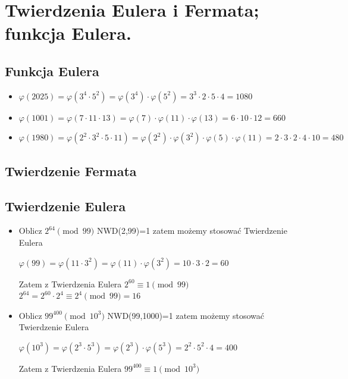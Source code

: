 \documentclass[12pt]{article}
\begin{document}
    \section{Twierdzenia Eulera i Fermata; funkcja Eulera.}
    \subsection{Funkcja Eulera}

    \begin{itemize}
        \item $\varphi(2025) = \varphi(3^4 \cdot 5^2) = \varphi(3^4) \cdot \varphi(5^2) = 3^3 \cdot 2 \cdot 5 \cdot 4 = 1080$
        \item $\varphi(1001) = \varphi(7\cdot11\cdot13) = \varphi(7) \cdot \varphi(11) \cdot \varphi(13) = 6 \cdot 10 \cdot12 = 660$
        \item $\varphi(1980) = \varphi(2^2 \cdot 3^2 \cdot 5 \cdot 11) = \varphi(2^2) \cdot \varphi(3^2) \cdot \varphi (5) \cdot \varphi(11) = 2 \cdot 3 \cdot 2 \cdot 4 \cdot 10 = 480$
    \end{itemize}

    \subsection{Twierdzenie Fermata}

    \subsection{Twierdzenie Eulera}
    \begin{itemize}
        \item Oblicz $2^{64} \pmod {99}$\newline
        NWD(2,99)=1 zatem możemy stosować Twierdzenie Eulera

        $\varphi(99) = \varphi(11\cdot 3^2) = \varphi(11) \cdot \varphi(3^2) = 10 \cdot 3 \cdot 2 = 60$

        Zatem z Twierdzenia Eulera\newline
        $2^{60} \equiv 1 \pmod {99}$\newline
        $2^{64} = 2^{60} \cdot 2^4 \equiv 2^4 \pmod {99} = 16$

        \item Oblicz $99^{400}\pmod {10^3}$\newline
        NWD(99,1000)=1 zatem możemy stosować Twierdzenie Eulera

        $\varphi(10^3) = \varphi(2^3 \cdot 5^3) = \varphi(2^3) \cdot \varphi(5^3) = 2^2 \cdot 5^2 \cdot 4 = 400$

        Zatem z Twierdzenia Eulera\newline
        $99^{400} \equiv 1 \pmod {10^3}$

    \end{itemize}
    \newpage
\end{document}

